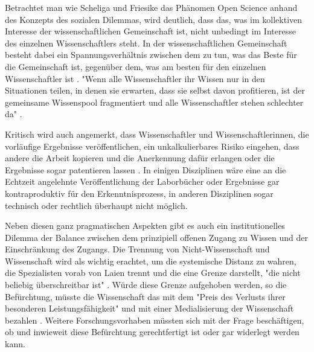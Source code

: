 Betrachtet man wie Scheliga und Friesike das Phänomen Open Science anhand des Konzepts des sozialen Dilemmas, wird deutlich, dass das, was im kollektiven Interesse der wissenschaftlichen Gemeinschaft ist, nicht unbedingt im Interesse des einzelnen Wissenschaftlers steht. In der wissenschaftlichen Gemeinschaft besteht dabei ein Spannungsverhältnis zwischen dem zu tun, was das Beste für die Gemeinschaft ist, gegenüber dem, was am besten für den einzelnen Wissenschaftler ist \cite{Ekins_2014} \cite{Patlak_2010} \cite{Wein_2010}. "Wenn alle Wissenschaftler ihr Wissen nur in den Situationen teilen, in denen sie erwarten, dass sie selbst davon profitieren, ist der gemeinsame Wissenspool fragmentiert und alle Wissenschaftler stehen schlechter da" \cite{Scheliga_2014}.

Kritisch wird auch angemerkt, dass Wissenschaftler und Wissenschaftlerinnen, die vorläufige Ergebnisse veröffentlichen, ein unkalkulierbares Risiko eingehen, dass andere die Arbeit kopieren und die Anerkennung dafür erlangen oder die Ergebnisse sogar patentieren lassen \cite{Peters_2014}. In einigen Disziplinen wäre eine an die Echtzeit angelehnte Veröffentlichung der Laborbücher oder Ergebnisse gar kontraproduktiv für den Erkenntnisprozess, in anderen Disziplinen sogar technisch oder rechtlich überhaupt nicht möglich.

Neben diesen ganz pragmatischen Aspekten gibt es auch ein institutionelles Dilemma der Balance zwischen dem prinzipiell offenen Zugang zu Wissen und der Einschränkung des Zugangs. Die Trennung von Nicht-Wissenschaft und Wissenschaft wird als wichtig erachtet, um die systemische Distanz zu wahren, die Spezialisten vorab von Laien trennt und die eine Grenze darstellt, "die nicht beliebig überschreitbar ist" \cite{Weingart_2005}. Würde diese Grenze aufgehoben werden, so die Befürchtung, müsste die Wissenschaft das mit dem "Preis des Verlusts ihrer besonderen Leistungsfähigkeit" und mit einer Medialisierung der Wissenschaft bezahlen \cite{Weingart_2005}. Weitere Forschungsvorhaben müssten sich mit der Frage beschäftigen, ob und inwieweit diese Befürchtung gerechtfertigt ist oder gar widerlegt werden kann.
